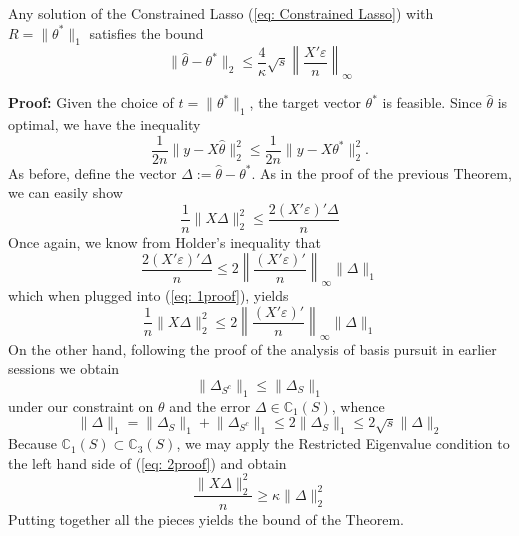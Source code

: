 \documentclass[10pt,handout,english]{beamer}
\newcommand{\C}{\mathbb{C}}
\begin{document}
\begin{frame}[allowframebreaks]
\begin{theorem}
Any solution of the Constrained Lasso (\ref{eq: Constrained Lasso}) with $R=\lVert\theta^*\rVert_1$ satisfies the bound
\[
\lVert \hat{\theta}-\theta^*\rVert_2\leq\frac{4}{\kappa}\sqrt{s}\left\lVert \frac{X'\varepsilon}{n}\right\rVert_{\infty}
\]
\end{theorem}
\noindent\textbf{Proof:} Given the choice of $t=\lVert \theta^*\rVert_1$, the target vector $\theta^*$ is feasible. Since $\hat{\theta}$ is optimal, we have the inequality
\[
\frac{1}{2n}\lVert y-X\hat{\theta}\rVert_2^2\leq\frac{1}{2n}\lVert y-X\theta^*\rVert_2^2.
\]
As before, define the vector $\Delta:=\hat{\theta}-\theta^*$. As in the proof of the previous Theorem, we can easily show
\begin{equation}\label{eq: 1proof}
\frac{1}{n}\lVert X\Delta\rVert_2^2\leq\frac{2(X'\varepsilon)'\Delta}{n}
\end{equation}
Once again, we know from Holder's inequality that
\[
\frac{2(X'\varepsilon)'\Delta}{n}\leq2\left\lVert\frac{(X'\varepsilon)'}{n}\right\rVert_{\infty}\lVert\Delta\rVert_1
\]
which when plugged into (\ref{eq: 1proof}), yields
\begin{equation}\label{eq: 2proof}
\frac{1}{n}\lVert X\Delta\rVert_2^2\leq2\left\lVert\frac{(X'\varepsilon)'}{n}\right\rVert_{\infty}\lVert\Delta\rVert_1
\end{equation}
On the other hand, following the proof of the analysis of basis pursuit in earlier sessions we obtain 
\[
\lVert\Delta_{S^c}\rVert_1\leq \lVert\Delta_{S}\rVert_1
\]
under our constraint on $\theta$ and the error $\Delta\in\C_1(S)$, whence
\[
\lVert\Delta\rVert_1=\lVert\Delta_S\rVert_1+\lVert\Delta_{S^c}\rVert_1\leq 2\lVert\Delta_S\rVert_1 \leq
2\sqrt{s}\lVert\Delta\rVert_2
\]
Because $\C_1(S)\subset\C_3(S)$, we may apply the Restricted Eigenvalue condition to the left hand side of (\ref{eq: 2proof}) and obtain 
\[
\frac{\lVert X\Delta\rVert_2^2}{n}\geq\kappa\lVert\Delta\rVert_2^2
\] 
Putting together all the pieces yields the bound of the Theorem.
\end{frame}
\end{document}
